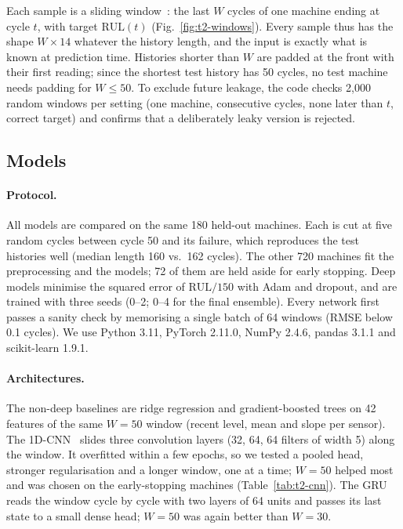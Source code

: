 Each sample is a sliding window~\cite{babu2016,zheng2017,li2018}: the last $W$ cycles of one machine
ending at cycle $t$, with target $\mathrm{RUL}(t)$ (Fig.~\ref{fig:t2-windows}). Every sample thus has
the shape $W \times 14$ whatever the history length, and the input is exactly what is known at
prediction time. Histories shorter than $W$ are padded at the front with their first reading; since
the shortest test history has 50 cycles, no test machine needs padding for $W \le 50$. To exclude
future leakage, the code checks 2{,}000 random windows per setting (one machine, consecutive cycles,
none later than $t$, correct target) and confirms that a deliberately leaky version is rejected.

\subsection{Models}
\label{sec:t2-models}

\paragraph{Protocol.} All models are compared on the same 180 held-out machines. Each is cut at five
random cycles between cycle 50 and its failure, which reproduces the test histories well (median
length 160 vs.\ 162 cycles). The other 720 machines fit the preprocessing and the models; 72 of them
are held aside for early stopping. Deep models minimise the squared error of $\mathrm{RUL}/150$ with
Adam and dropout, and are trained with three seeds (0--2; 0--4 for the final ensemble). Every network
first passes a sanity check by memorising a single batch of 64 windows (RMSE below 0.1 cycles). We use
Python 3.11, PyTorch 2.11.0, NumPy 2.4.6, pandas 3.1.1 and scikit-learn 1.9.1.

\paragraph{Architectures.} The non-deep baselines are ridge regression and gradient-boosted trees on
42 features of the same $W=50$ window (recent level, mean and slope per sensor). The 1D-CNN~\cite{babu2016,li2018} slides
three convolution layers (32, 64, 64 filters of width 5) along the window. It overfitted within a few
epochs, so we tested a pooled head, stronger regularisation and a longer window, one at a time;
$W=50$ helped most and was chosen on the early-stopping machines (Table~\ref{tab:t2-cnn}). The
GRU~\cite{cho2014} reads the window cycle by cycle with two layers of 64 units and passes its last
state to a small dense head; $W=50$ was again better than $W=30$.

